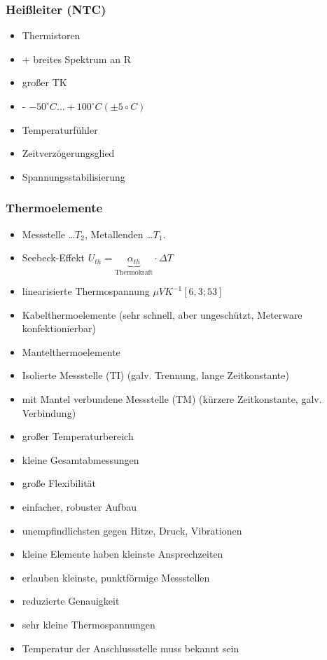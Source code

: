 \documentclass[a4paper]{scrartcl}
\begin{document}
\subsubsection{Heißleiter (NTC)}
\begin{itemize}
\item Thermistoren
\item + breites Spektrum an R
\item großer TK
\item - $-50^\circ C \dots + 100 ^\circ C (\pm 5\circ C)$
\item Temperaturfühler
\item Zeitverzögerungsglied
\item Spannungsstabilisierung
\end{itemize}

\subsubsection{Thermoelemente}
\begin{itemize}
\item Messstelle \dots $T_2$, Metallenden \dots $T_1$.
\item Seebeck-Effekt $U_{th} = \underbrace{\alpha_{th}}_{\text{Thermokraft}} \cdot \Delta T$
\item linearisierte Thermospannung $\mu V K^{-1} [6,3;53]$

\item Kabelthermoelemente (sehr schnell, aber ungeschützt, Meterware konfektionierbar)
\item Mantelthermoelemente
\item Isolierte Messstelle (TI) (galv. Trennung, lange Zeitkonstante)
\item mit Mantel verbundene Messstelle (TM) (kürzere Zeitkonstante, galv. Verbindung)
\item großer Temperaturbereich
\item kleine Gesamtabmessungen
\item große Flexibilität
\item einfacher, robuster Aufbau
\item unempfindlichsten gegen Hitze, Druck, Vibrationen
\item kleine Elemente haben kleinste Ansprechzeiten
\item erlauben kleinste, punktförmige Messstellen
\item reduzierte Genauigkeit
\item sehr kleine Thermospannungen
\item Temperatur der Anschlussstelle muss bekannt sein
\end{itemize}
\end{document}
